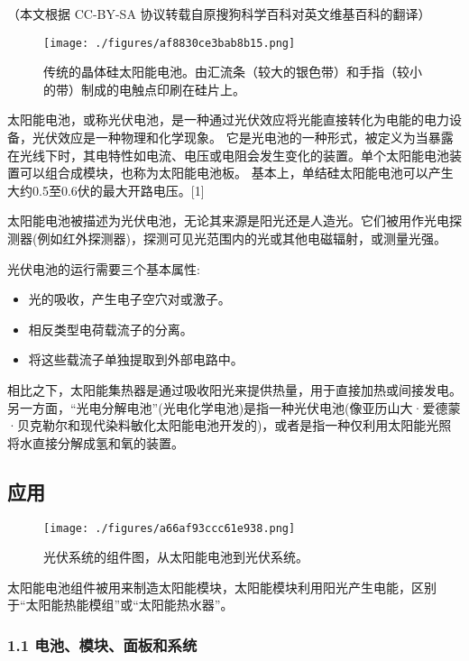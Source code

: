 
（本文根据 CC-BY-SA 协议转载自原搜狗科学百科对英文维基百科的翻译）

\begin{figure}[ht]
\centering
\texttt{[image: ./figures/af8830ce3bab8b15.png]}
\caption{传统的晶体硅太阳能电池。由汇流条（较大的银色带）和手指（较小的带）制成的电触点印刷在硅片上。} \label{fig_TYNDC_1}
\end{figure}

太阳能电池，或称光伏电池，是一种通过光伏效应将光能直接转化为电能的电力设备，光伏效应是一种物理和化学现象。 它是光电池的一种形式，被定义为当暴露在光线下时，其电特性如电流、电压或电阻会发生变化的装置。单个太阳能电池装置可以组合成模块，也称为太阳能电池板。 基本上，单结硅太阳能电池可以产生大约0.5至0.6伏的最大开路电压。[1]

太阳能电池被描述为光伏电池，无论其来源是阳光还是人造光。它们被用作光电探测器(例如红外探测器)，探测可见光范围内的光或其他电磁辐射，或测量光强。

光伏电池的运行需要三个基本属性:
\begin{itemize}
\item 光的吸收，产生电子空穴对或激子。
\item 相反类型电荷载流子的分离。
\item 将这些载流子单独提取到外部电路中。
\end{itemize}

相比之下，太阳能集热器是通过吸收阳光来提供热量，用于直接加热或间接发电。另一方面，“光电分解电池”(光电化学电池)是指一种光伏电池(像亚历山大·爱德蒙·贝克勒尔和现代染料敏化太阳能电池开发的)，或者是指一种仅利用太阳能光照将水直接分解成氢和氧的装置。

\subsection{应用}

\begin{figure}[ht]
\centering
\texttt{[image: ./figures/a66af93ccc61e938.png]}
\caption{光伏系统的组件图，从太阳能电池到光伏系统。} \label{fig_TYNDC_17}
\end{figure}

太阳能电池组件被用来制造太阳能模块，太阳能模块利用阳光产生电能，区别于“太阳能热能模组”或“太阳能热水器”。

\subsubsection{1.1 电池、模块、面板和系统}

